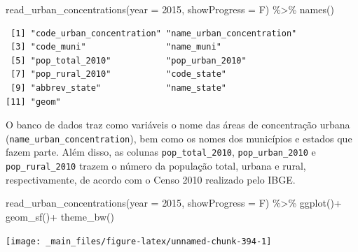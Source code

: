 \documentclass[
  brazilian,
]{book}
\newenvironment{Shaded}{\begin{snugshade}}{\end{snugshade}}
\newcommand{\AttributeTok}[1]{\textcolor[rgb]{0.77,0.63,0.00}{#1}}
\newcommand{\DecValTok}[1]{\textcolor[rgb]{0.00,0.00,0.81}{#1}}
\newcommand{\FunctionTok}[1]{\textcolor[rgb]{0.00,0.00,0.00}{#1}}
\newcommand{\NormalTok}[1]{#1}
\newcommand{\SpecialCharTok}[1]{\textcolor[rgb]{0.00,0.00,0.00}{#1}}
\begin{document}
\begin{Shaded}
\begin{Highlighting}[]
\FunctionTok{read\_urban\_concentrations}\NormalTok{(}\AttributeTok{year =} \DecValTok{2015}\NormalTok{, }\AttributeTok{showProgress =}\NormalTok{ F) }\SpecialCharTok{\%\textgreater{}\%} \FunctionTok{names}\NormalTok{()}
\end{Highlighting}
\end{Shaded}

\begin{verbatim}
 [1] "code_urban_concentration" "name_urban_concentration"
 [3] "code_muni"                "name_muni"               
 [5] "pop_total_2010"           "pop_urban_2010"          
 [7] "pop_rural_2010"           "code_state"              
 [9] "abbrev_state"             "name_state"              
[11] "geom"                    
\end{verbatim}

O banco de dados traz como variáveis o nome das áreas de concentração urbana (\texttt{name\_urban\_concentration}), bem como os nomes dos municípios e estados que fazem parte. Além disso, as colunas \texttt{pop\_total\_2010}, \texttt{pop\_urban\_2010} e \texttt{pop\_rural\_2010} trazem o número da população total, urbana e rural, respectivamente, de acordo com o Censo 2010 realizado pelo IBGE.

\begin{Shaded}
\begin{Highlighting}[]
\FunctionTok{read\_urban\_concentrations}\NormalTok{(}\AttributeTok{year =} \DecValTok{2015}\NormalTok{,}
                          \AttributeTok{showProgress =}\NormalTok{ F) }\SpecialCharTok{\%\textgreater{}\%} 
  \FunctionTok{ggplot}\NormalTok{()}\SpecialCharTok{+}
  \FunctionTok{geom\_sf}\NormalTok{()}\SpecialCharTok{+}
  \FunctionTok{theme\_bw}\NormalTok{()}
\end{Highlighting}
\end{Shaded}

\begin{center}\texttt{[image: \_main\_files/figure-latex/unnamed-chunk-394-1]} \end{center}
\end{document}
